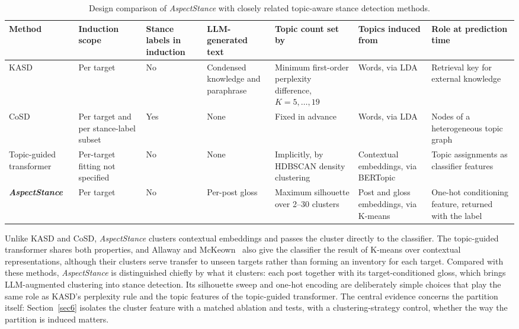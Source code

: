 \documentclass[pdflatex,sn-mathphys-num,iicol]{sn-jnl}%
\begin{document}
\begin{table}[t]
	\caption{Design comparison of \textit{AspectStance} with closely related topic-aware stance detection methods.}
	\label{tab:positioning}
	\centering
	\setlength{\tabcolsep}{5pt}
	\renewcommand{\arraystretch}{1.2}
	\tablebodyfont{}
	\begin{tabularx}{\textwidth}{@{}>{\hsize}Y >{\hsize}Y >{\hsize}Y >{\hsize}Y >{\hsize}Y >{\hsize}Y >{\hsize}Y@{}}
		\toprule
		\textbf{Method} & \textbf{Induction scope} & \textbf{Stance labels in induction} & \textbf{LLM-\allowbreak generated text} & \textbf{Topic count set by} & \textbf{Topics induced from} & \textbf{Role at prediction time} \\
		\midrule
		KASD \cite{li2023stance} & Per target & No & Condensed knowledge and paraphrase & Minimum first-order perplexity difference, \mbox{$K=5,\ldots,19$} & Words, via LDA & Retrieval key for external knowledge \\
		\addlinespace[2pt]
		CoSD \cite{cheng2024cosd} & Per target and per stance-label subset & Yes & None & Fixed in advance & Words, via LDA & Nodes of a heterogeneous topic graph \\
		\addlinespace[2pt]
		Topic-guided transformer \cite{muthusami2025interpretable} & Per-target fitting not specified & No & None & Implicitly, by HDBSCAN density clustering & Contextual embeddings, via BERTopic & Topic assignments as classifier features \\
		\addlinespace[2pt]
		\textbf{\textit{AspectStance}} & Per target & No & Per-post gloss & Maximum silhouette over 2--30 clusters & Post and gloss embeddings, via K-means & One-hot conditioning feature, returned with the label \\
		\bottomrule
	\end{tabularx}
\end{table}

Unlike KASD and CoSD, \textit{AspectStance} clusters contextual embeddings and passes the cluster directly to the classifier. The topic-guided transformer shares both properties, and Allaway and McKeown~\cite{allaway2020zero} also give the classifier the result of K-means over contextual representations, although their clusters serve transfer to unseen targets rather than forming an inventory for each target. Compared with these methods, \textit{AspectStance} is distinguished chiefly by what it clusters: each post together with its target-conditioned gloss, which brings LLM-augmented clustering \cite{viswanathan2024fewshot,deraedt2023idas} into stance detection. Its silhouette sweep and one-hot encoding are deliberately simple choices that play the same role as KASD's perplexity rule and the topic features of the topic-guided transformer. The central evidence concerns the partition itself: Section~\ref{sec6} isolates the cluster feature with a matched ablation and tests, with a clustering-strategy control, whether the way the partition is induced matters.
\end{document}
